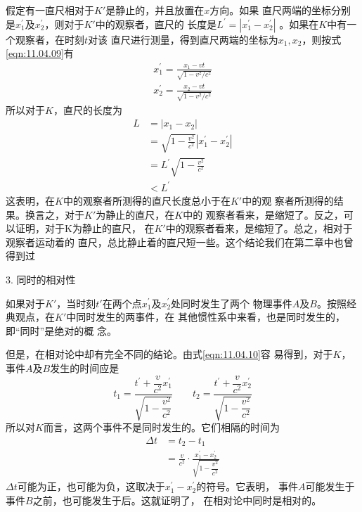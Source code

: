 假定有一直尺相对于$ K ' $是静止的，并且放置在$ x $方向。如果
直尺两端的坐标分别是$ x _ 1 ^ { \prime } $及$ x _ 2 ^ { \prime } $，则对于$ K ' $中的观察者，直尺的
长度是$  L ^ { \prime } = | x _ { 1 } ^ { \prime } - x _ { 2 } ^ { \prime } |  $ 。如果在$ K $中有一个观察者，在时刻$ t $对该
直尺进行测量，得到直尺两端的坐标为$ x _ 1, x _ 2 $，则按式 \eqref{eqn:11.04.09}有
\begin{align*}
    x _ { 1 } ^ { \prime } = \frac { x _ { 1 } - v t } { \sqrt { 1 - v ^ { 2 } / c ^ { 2 } } }  \\
    x _ { 2 } ^ { \prime } = \frac { x _ { 2 } - v t } { \sqrt { 1 - v ^ { 2 } / c ^ { 2 } } }
\end{align*}
所以对于$ K $，直尺的长度为
\begin{equation}\label{eqn:11.05.02}
    \begin{split}
        L &= | x _ { 1 } - x _ { 2 } |  \\
          &= \sqrt { 1 - \frac { v ^ { 2 } } { c ^ { 2 } } } | x _ { 1 } ^ { \prime } - x _ { 2 } ^ { \prime } |  \\
          &= L ^ { \prime } \sqrt { 1 - \frac { v ^ { 2 } } { c ^ { 2 } } }  \\
          &< L ^ { \prime }
    \end{split}
\end{equation}
这表明，在$ K $中的观察者所测得的直尺长度总小于在$ K ' $中的观
察者所测得的结果。换言之，对于$ K ' $为静止的直尺，在$ K $中的
观察者看来，是缩短了。反之，可以证明，对于K为静止的直尺，
在$ K ' $中的观察者看来，是缩短了。总之，相对于观察者运动着的
直尺，总比静止着的直尺短一些。这个结论我们在第二章中也曾
得到过

\textsf{3. 同时的相对性}

如果对于$ K ' $，当时刻$ t ' $在两个点$ x _ { 1 } ^ { \prime } $及$ x _ { 2 } ^ { \prime } $处同时发生了两个
物理事件$ A $及$ B $。按照经典观点，在$ K ' $中同时发生的两事件，在
其他惯性系中来看，也是同时发生的，即“同时”是绝对的概
念。

但是，在相对论中却有完全不同的结论。由式\eqref{eqn:11.04.10}容
易得到，对于$ K $，事件$ A $及$ B $发生的时间应是
\begin{equation*}
    t_{1}=\frac{t^{\prime}+\dfrac{v}{c^{2}} x_{1}^{\prime}}{\sqrt{1-\dfrac{v^{2}}{c^{2}}}}
    \qquad
    t_{2}=\frac{t^{\prime}+\dfrac{v}{c^{2}} x_{2}^{\prime}}{\sqrt{1-\dfrac{v^{2}}{c^{2}}}}
\end{equation*}
所以对$ K $而言，这两个事件不是同时发生的。它们相隔的时间为\vspace{-1.56em}
\begin{equation}\label{eqn:11.05.03}
    \begin{aligned}
        \Delta t &=t_{2}-t_{1} \\
        &=\frac{v}{c^{2}} \cdot \frac{x_{1}^{\prime}-x_{2}^{\prime}}{\sqrt{1-\dfrac{v^{2}}{c^{2}}}}
    \end{aligned}
\end{equation}
$ \Delta t $可能为正，也可能为负，这取决于$ x_{1}^{\prime}-x_{2}^{\prime} $的符号。它表明，
事件$ A $可能发生于事件$ B $之前，也可能发生于后。这就证明了，
在相对论中同时是相对的。

